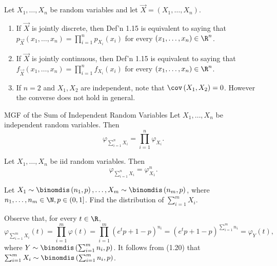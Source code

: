 \documentclass[stat333]{subfiles}
\begin{document}
    \np Let $X_1,\ldots,X_n$ be random variables and let $\vec{X}=\left( X_1,\ldots,X_n \right)$.
    \begin{enumerate}
        \item If $\vec{X}$ is jointly discrete, then Def'n 1.15 is equivalent to saying that $p_{\vec{X}}\left( x_1,\ldots,x_n \right) = \prod^{n}_{i=1} p_{X_i}\left( x_i \right) $ for every $\left( x_1,\ldots,x_n \right) \in\R^n$.
        \item If $\vec{X}$ is jointly continuous, then Def'n 1.15 is equivalent to saying that $f_{\vec{X}}\left( x_1,\ldots,x_n \right) = \prod^{n}_{i=1} f_{X_i}\left( x_i \right)$ for every $\left( x_1,\ldots,x_n \right) \in\R^n$.
        \item If $n=2$ and $X_1,X_2$ are independent, note that $\cov\left( X_1,X_2 \right) = 0$. However the converse does not hold in general.
    \end{enumerate}

    \begin{theorem}{MGF of the Sum of Independent Random Variables}
        Let $X_1,\ldots,X_n$ be independent random variables. Then
        \begin{equation*}
            \varphi_{\sum^{n}_{i=1} X_i} = \prod^{n}_{i=1} \varphi_{X_i}.
        \end{equation*}
    \end{theorem}

    \begin{cor}{}
        Let $X_1,\ldots,X_n$ be iid random variables. Then
        \begin{equation*}
            \varphi_{\sum^{n}_{i=1} X_i} = \varphi_{X_1}^n.
        \end{equation*}
    \end{cor}	

    Let $X_1\sim\binomdis\left( n_1,p \right) , \ldots, X_m\sim\binomdis\left( n_m,p \right)$, where $n_1,\ldots,n_m\in\N, p\in\left( 0,1 \right]$. Find the distribution of $\sum^{m}_{i=1} X_i$.

    \begin{subproof}[Answer]
        Observe that, for every $t\in\R$,
        \begin{equation*}
            \varphi_{\sum^{m}_{i=1} X_i}\left( t \right) = \prod^{m}_{i=1} \varphi\left( t \right) = \prod^{m}_{i=1} \left( e^tp+1-p \right) ^{n_i} = \left( e^tp+1-p \right) ^{\sum^{m}_{i=1} n_i} = \varphi_Y\left( t \right) ,
        \end{equation*}
        where $Y\sim\binomdis\left( \sum^{m}_{i=1} n_i, p \right)$. It follows from (1.20) that $\sum^{m}_{i=1} X_i\sim\binomdis\left( \sum^{m}_{i=1} n_i, p \right)$.
    \end{subproof}
\end{document}
